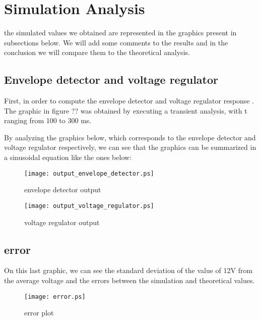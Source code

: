 \section{Simulation Analysis}
\label{sec:simulation}
the simulated values we obtained are represented in the graphics present in subsections below. We will add some comments to the results and in the conclusion we will compare them to the theoretical analysis.


\subsection{Envelope detector and voltage regulator }

First, in order to compute the envelope detector and voltage regulator response . The graphic in figure ?? was obtained by executing a transient analysis, with t ranging from 100 to 300 ms.

By analyzing the graphics below, which corresponds to the envelope detector and voltage regulator respectively, we can see that the graphics can be summarized in a sinusoidal equation like the ones below:



\begin{figure}[h!] \centering
	\texttt{[image: output\_envelope\_detector.ps]}
	\caption{envelope detector output}
	\label{fig:rc1}
\end{figure}
 

\begin{figure}[h!] \centering
	\texttt{[image: output\_voltage\_regulator.ps]}
	\caption{voltage regulator output}
	\label{fig:rc1}
\end{figure}


\subsection{error}

On this last graphic, we can see the standard deviation of the value of 12V from the average voltage and the errors between the simulation and theoretical values.
\begin{figure}[h!] \centering
\texttt{[image: error.ps]}
\caption{error plot}
\label{fig:rc1}
\end{figure}



